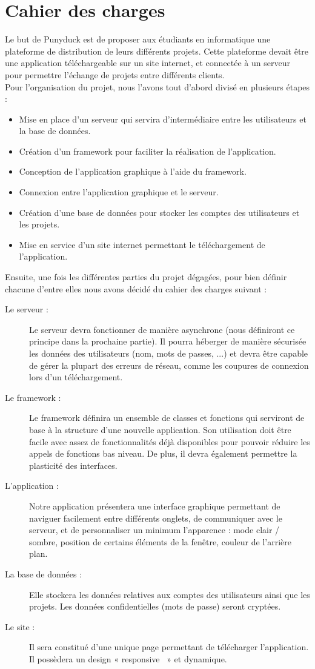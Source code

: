 \documentclass{report}
\begin{document}
\section*{Cahier des charges}
Le but de Punyduck est de proposer aux étudiants en informatique une plateforme de distribution de leurs différents projets. Cette plateforme devait être une application téléchargeable sur un site internet, et connectée à un serveur pour permettre l'échange de projets entre différents clients. \\
Pour l'organisation du projet, nous l'avons tout d'abord divisé en plusieurs étapes : 
\begin{itemize}[label=$-$]
    \item Mise en place d’un serveur qui servira d’intermédiaire entre les utilisateurs et la base de données.
    \item Création d’un framework pour faciliter la réalisation de l’application.
    \item Conception de l’application graphique à l’aide du framework.
    \item Connexion entre l’application graphique et le serveur.
    \item Création d’une base de données pour stocker les comptes des utilisateurs et les
projets.
    \item Mise en service d’un site internet permettant le téléchargement de l’application.
\end{itemize}
\newpage
Ensuite, une fois les différentes parties du projet dégagées, pour bien définir chacune d'entre elles nous avons décidé du cahier des charges suivant :
\begin{description}
    \item[Le serveur :] Le serveur devra fonctionner de manière asynchrone (nous définiront ce principe dans la prochaine partie). Il pourra héberger de manière sécurisée les données des utilisateurs (nom, mots de passes, ...) et devra être capable de gérer la plupart des erreurs de réseau, comme les coupures de connexion lors d'un téléchargement.
    \item[Le framework :] Le framework définira un ensemble de classes et fonctions qui serviront de base à la structure d'une nouvelle application. Son utilisation doit être facile avec assez de fonctionnalités déjà disponibles pour pouvoir réduire les appels de fonctions bas niveau. De plus, il devra également permettre la plasticité des interfaces.
    \item[L’application :] Notre application présentera une interface graphique permettant de naviguer facilement entre différents onglets, de communiquer avec le serveur, et de personnaliser un minimum l'apparence : mode clair / sombre, position de certains éléments de la fenêtre, couleur de l’arrière plan.
    \item[La base de données :] Elle stockera les données relatives aux comptes des utilisateurs ainsi que les projets. Les données confidentielles (mots de passe) seront cryptées.
    \item[Le site :] Il sera constitué d'une unique page permettant de télécharger l'application. Il possèdera un design « responsive~ » et dynamique.
\end{description}
\end{document}
